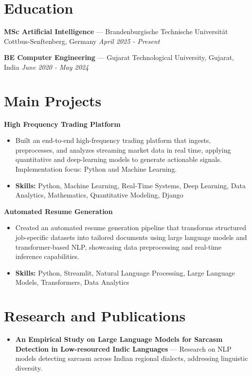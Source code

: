 \documentclass[a4paper,10pt]{article}
\begin{document}
\section*{Education}
\textbf{MSc Artificial Intelligence} — Brandenburgische Technische Universität Cottbus-Senftenberg, Germany \hfill \textit{April 2025 - Present}\par
\vspace{1.5pt}
\textbf{BE Computer Engineering} — Gujarat Technological University, Gujarat, India \hfill \textit{June 2020 - May 2024}\par

\section*{Main Projects}
\textbf{High Frequency Trading Platform}\par
\vspace{1pt}
\begin{itemize}
  \item Built an end-to-end high-frequency trading platform that ingests, preprocesses, and analyzes streaming market data in real time, applying quantitative and deep-learning models to generate actionable signals. Implementation focus: Python and Machine Learning.
  \item \textbf{Skills:} Python, Machine Learning, Real-Time Systems, Deep Learning, Data Analytics, Mathematics, Quantitative Modeling, Django
\end{itemize}
\vspace{3pt}
\textbf{Automated Resume Generation}\par
\vspace{1pt}
\begin{itemize}
  \item Created an automated resume generation pipeline that transforms structured job-specific datasets into tailored documents using large language models and transformer-based NLP, showcasing data preprocessing and real-time inference capabilities.
  \item \textbf{Skills:} Python, Streamlit, Natural Language Processing, Large Language Models, Transformers, Data Analytics
\end{itemize}

\section*{Research and Publications}
\begin{itemize}
\item \textbf{An Empirical Study on Large Language Models for Sarcasm Detection in Low-resourced Indic Languages} — Research on NLP models detecting sarcasm across Indian regional dialects, addressing linguistic diversity.
\end{itemize}
\end{document}
